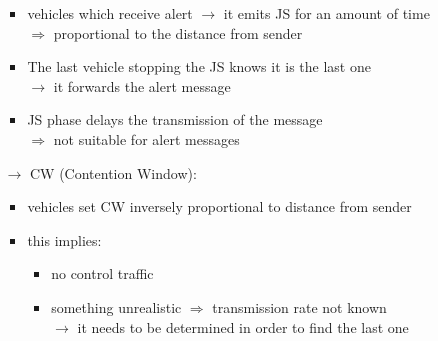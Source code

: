 \begin{itemize}
\begin{itemize}
\begin{itemize}
            \item vehicles which receive alert $\rightarrow$ it emits JS for
            an amount of time\\ $\Rightarrow$ proportional to the distance from sender
            \item The last vehicle stopping the JS knows it is the last one\\
            $\rightarrow$ it forwards the alert message
            \item JS phase delays the transmission of the message\\
            $\Rightarrow$ not suitable for alert messages
        \end{itemize}
        \item[$\rightarrow$] CW (Contention Window):
        \begin{itemize}
            \item vehicles set CW inversely proportional to distance from sender
            \item this implies:
            \begin{itemize}
                \item no control traffic
                \item something unrealistic $\Rightarrow$ transmission rate not known\\
                $\rightarrow$ it needs to be determined in order to find the last one
            \end{itemize}
        \end{itemize}
    \end{itemize}
\end{itemize}

